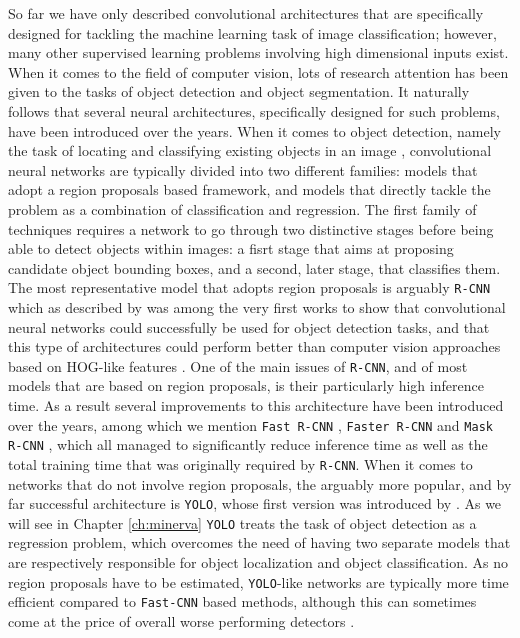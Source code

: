So far we have only described convolutional architectures that are specifically designed for tackling the machine learning task of image classification; however, many other supervised learning problems involving high dimensional inputs exist. When it comes to the field of computer vision, lots of research attention has been given to the tasks of object detection and object segmentation. It naturally follows that several neural architectures, specifically designed for such problems, have been introduced over the years. When it comes to object detection, namely the task of locating and classifying existing objects in an image \cite{jiao2019survey}, convolutional neural networks are typically divided into two different families: models that adopt a region proposals based framework, and models that directly tackle the problem as a combination of classification and regression. The first family of techniques requires a network to go through two distinctive stages before being able to detect objects within images: a fisrt stage that aims at proposing candidate object bounding boxes, and a second, later stage, that classifies them. The most representative model that adopts region proposals is arguably \texttt{R-CNN} \cite{girshick2014rich} which as described by \citet{jiao2019survey} was among the very first works to show that convolutional neural networks could successfully be used for object detection tasks, and that this type of architectures could perform better than computer vision approaches based on HOG-like features \cite{jiao2019survey}. One of the main issues of \texttt{R-CNN}, and of most models that are based on region proposals, is their particularly high inference time. As a result several improvements to this architecture have been introduced over the years, among which we mention \texttt{Fast R-CNN} \cite{ren2015faster}, \texttt{Faster R-CNN} and \texttt{Mask R-CNN} \cite{he2017mask}, which all managed to significantly reduce inference time as well as the total training time that was originally required by \texttt{R-CNN}. When it comes to networks that do not involve region proposals, the arguably more popular, and by far successful architecture is \texttt{YOLO}, whose first version was introduced 
by \citet{redmon2016you}. As we will see in Chapter \ref{ch:minerva} \texttt{YOLO} treats the task of object detection as a regression problem, which overcomes the need of having two separate models that are respectively responsible for object localization and object classification. As no region proposals have to be estimated, \texttt{YOLO}-like networks \cite{redmon2016you,redmon2017yolo9000,huang2018yolo} are typically more time efficient compared to \texttt{Fast-CNN} based methods, although this can sometimes come at the price of overall worse performing detectors \cite{jiao2019survey}.

